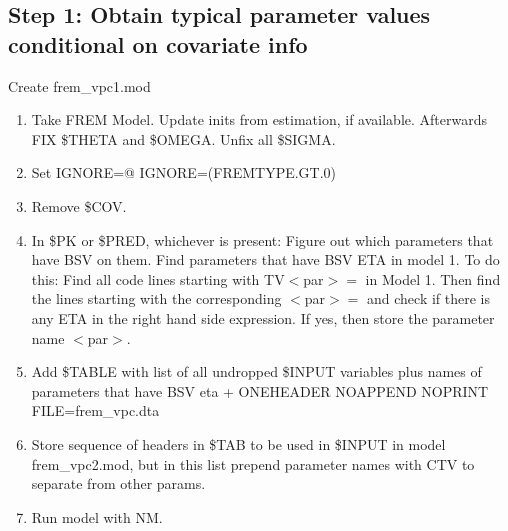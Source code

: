 \subsection{Step 1: Obtain typical parameter values conditional on covariate info}
Create frem\_vpc1.mod

\begin{enumerate}
	\item Take FREM Model. Update inits from estimation, if available. Afterwards FIX \$THETA and \$OMEGA. Unfix all \$SIGMA.
	\item Set IGNORE=@ IGNORE=(FREMTYPE.GT.0)
	\item Remove \$COV.
	\item In \$PK or \$PRED, whichever is present:
Figure out which parameters that have BSV %
on them.
Find parameters
that have BSV ETA %
in model 1.
To do this: Find all code lines starting with TV$<$par$>=$ in Model 1. Then find the lines starting with the corresponding $<$par$>=$ and
check if there is any ETA in the right hand side expression. If yes, then store the parameter name $<$par$>$.
	\item Add \$TABLE with list of all undropped \$INPUT variables plus names of parameters that have BSV eta  + ONEHEADER NOAPPEND NOPRINT FILE=frem\_vpc.dta
	\item Store sequence of headers in \$TAB to be used in \$INPUT in model frem\_vpc2.mod, but in this list prepend parameter names with CTV to separate from other params.
	\item Run model with NM.
\end{enumerate}


